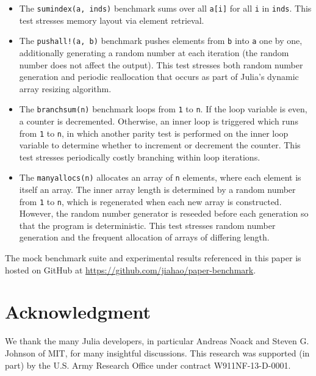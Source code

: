 \documentclass[conference]{IEEEtran}
\begin{document}
\begin{itemize}
    \item The \lstinline|sumindex(a, inds)| benchmark sums over all \lstinline|a[i]| for all
    \lstinline|i| in \lstinline|inds|. This test stresses memory layout via element
    retrieval.
    \item The \lstinline|pushall!(a, b)| benchmark pushes elements from \lstinline|b| into
    \lstinline|a| one by one, additionally generating a random number at each iteration (the
    random number does not affect the output). This test stresses both random number
    generation and periodic reallocation that occurs as part of Julia's dynamic array
    resizing algorithm.
    \item The \lstinline|branchsum(n)| benchmark loops from \lstinline|1| to \lstinline|n|.
    If the loop variable is even, a counter is decremented. Otherwise, an inner loop is
    triggered which runs from \lstinline|1| to \lstinline|n|, in which another parity test
    is performed on the inner loop variable to determine whether to increment or decrement
    the counter. This test stresses periodically costly branching within loop iterations.
    \item The \lstinline|manyallocs(n)| allocates an array of \lstinline|n| elements, where
    each element is itself an array. The inner array length is determined by a random number
    from \lstinline|1| to \lstinline|n|, which is regenerated when each new array is
    constructed. However, the random number generator is reseeded before each generation so
    that the program is deterministic. This test stresses random number generation and
    the frequent allocation of arrays of differing length.
\end{itemize}

The mock benchmark suite and experimental results referenced in this paper is hosted on
GitHub at \url{https://github.com/jiahao/paper-benchmark}.

\label{sec:acknowledgement}
\section*{Acknowledgment}

We thank the many Julia developers, in particular Andreas Noack and Steven G.
Johnson of MIT, for many insightful discussions.
This research was supported (in part) by the U.S. Army Research Office under
contract W911NF-13-D-0001.




\end{document}

